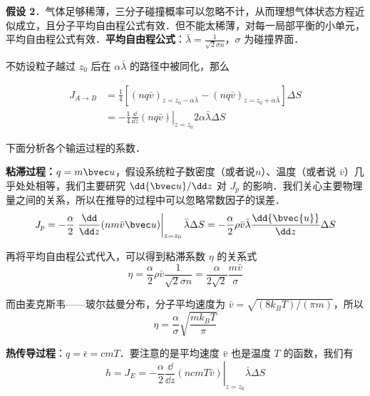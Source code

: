 \textbf{假设 2}．气体足够稀薄，三分子碰撞概率可以忽略不计，从而理想气体状态方程近似成立，且分子平均自由程公式有效．但不能太稀薄，对每一局部平衡的小单元，平均自由程公式有效．\textbf{平均自由程公式}：$\bar \lambda = \frac{1}{\sqrt{2} \sigma n}$，$\sigma$ 为碰撞界面．

不妨设粒子越过 $z_0$ 后在 $\alpha \bar \lambda$ 的路径中被同化，那么

\begin{align}
J_{A\rightarrow B} &=\frac{1}{4}[(nq\bar v)_{z=z_0-\alpha \bar \lambda}-(nq\bar v)_{z=z_0+\alpha \bar \lambda}]\Delta S\\
&=-\frac{1}{4}\left.\frac{\dd}{\dd z}(nq\bar v)\right|_{z=z_0} 2\alpha\bar \lambda \Delta S
\end{align}

下面分析各个输运过程的系数．

\textbf{粘滞过程：}$q=m\bvec u$，假设系统粒子数密度（或者说$n$）、温度（或者说 $\bar v$）几乎处处相等，我们主要研究 $\dd{\bvec u}/\dd z$ 对 $J_p$ 的影响．我们关心主要物理量之间的关系，所以在推导的过程中可以忽略常数因子的误差．
\begin{equation}
J_p=-\frac{\alpha}{2}\left.\frac{\dd}{\dd z}(nm\bar v \bvec u)\right|_{z=z_0}\bar \lambda \Delta S
=-\frac{\alpha}{2}\rho\bar v \bar \lambda \frac{\dd{\bvec{u}}}{\dd z}\Delta S
\end{equation}

再将平均自由程公式代入，可以得到粘滞系数 $\eta$ 的关系式
\begin{equation}
\eta = \frac{\alpha}{2}\rho\bar v \frac{1}{\sqrt{2}\sigma n}=\frac{\alpha}{2\sqrt{2}}\frac{m \bar v}{\sigma}
\end{equation}

而由麦克斯韦——玻尔兹曼分布，分子平均速度为 $\bar v=\sqrt{(8k_BT)/(\pi m)}$，所以
\begin{equation}
\eta = \frac{\alpha}{\sigma}\sqrt{\frac{mk_BT}{\pi}}
\end{equation}

\textbf{热传导过程}：$q=\bar \epsilon = cmT$．要注意的是平均速度 $\bar v$ 也是温度 $T$ 的函数，我们有
\begin{equation}
h=J_E=-\frac{\alpha}{2}\left.\frac{\dd }{\dd z}(ncmT\bar v)\right|_{z=z_0} \bar\lambda \Delta S
\end{equation}